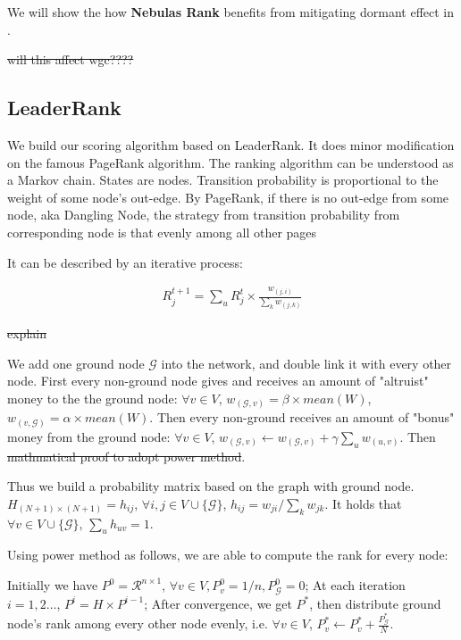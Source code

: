We will show the how \textbf{Nebulas Rank} benefits from mitigating dormant effect in .

\st{will this affect wgc????}

\subsection{LeaderRank} \label{sec:leaderrank}
We build our scoring algorithm based on LeaderRank\cite{Li2014}\cite{Chen2013}. It does minor modification on the famous PageRank algorithm\cite{Brin2010}\cite{page1999pagerank}. The ranking algorithm can be understood as a Markov chain. States are nodes. Transition probability is proportional to the weight of some node's out-edge. By PageRank, if there is no out-edge from some node, aka Dangling Node\cite{Kim2002}, the strategy from transition probability from corresponding node is that evenly among all other pages


 It can be described  by an iterative process:

\begin{align}
	R_j^{t+1} = \sum_u R_j^t \times \frac{ w_{(j,i)} }{ \sum_k w_{(j,k)} }
\end{align}


\st{explain}

We add one ground node $\mathcal{G}$ into the network, and double link it with every other node. First every non-ground node gives and receives an amount of "altruist" money to the the ground node: $\forall v \in V$, $w_{(\mathcal{G}, v)} = \beta \times mean(W)$, $w_{(v,\mathcal{G})} = \alpha \times mean(W)  $. Then every non-ground receives an amount of "bonus" money from the ground node:  $\forall v \in V$, $w_{(\mathcal{G}, v)} \leftarrow w_{(\mathcal{G}, v)} + \gamma \sum_u w_{(u,v)}$. Then \st{mathmatical proof to adopt power method}.

Thus we build a probability matrix based on the graph with ground node. $H_{(N+1) \times (N+1)} = h_{ij}$, $\forall i,j \in V \cup \{\mathcal{G}\}$, $h_{ij} = w_{ji} / \sum_k{w_{jk}}$. It holds that $\forall v \in V \cup \{\mathcal{G}\}$, $\sum_u{h_{uv}} = 1$.

Using power method as follows, we are able to compute the rank for every node:

Initially we have $P^0 = \mathcal{R}^{n \times 1} $, $\forall v \in V, P_v^0 = 1/n, P_{\mathcal{G}}^0 = 0$;
At each iteration $i=1,2 \dots $, $P^i = H \times P^{i-1}$;
After convergence, we get $P^*$, then distribute ground node's rank among every other node evenly, i.e. $\forall v \in V$, $P^*_v \leftarrow P^*_v + \frac{P^*_{\mathcal{G}}}{N}$.



